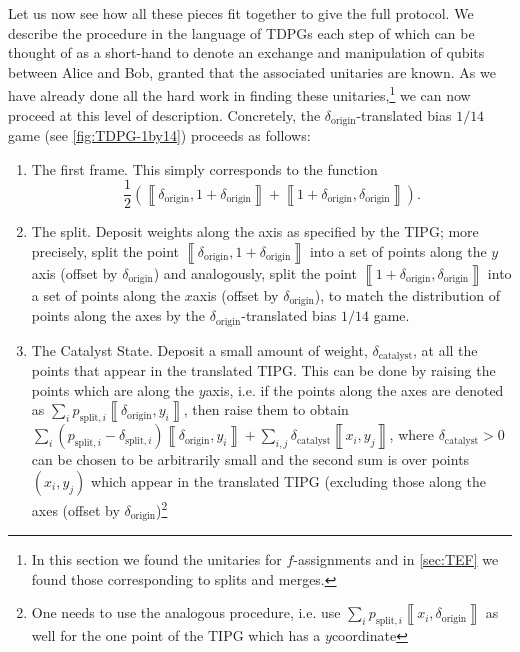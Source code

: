 \documentclass{theoretics}
\newcommand{\atul}[1]{#1} %
\newcommand{\dorigin}[0]{\delta_{\textrm{origin}}} %
\begin{document}
Let us now see how all these pieces fit together
to give the full protocol. We describe the procedure
in the language of TDPGs each step of which can be thought of as a short-hand to denote
an exchange and manipulation of qubits between Alice and Bob, granted that
the associated unitaries are known. As we have already done all the
hard work in finding these unitaries,\footnote{In this section we found the unitaries for $f$-assignments and in \cref{sec:TEF} we found those corresponding to splits and merges.} we can now proceed at this level of description. Concretely, the $\dorigin$-translated bias $1/14$ game (see  \cref{fig:TDPG-1by14}) \atul{proceeds} as follows:
\begin{enumerate}
  \item The first frame. This simply corresponds to the function $$\frac{1}{2}\left(\left\llbracket \dorigin,1 + \dorigin \right\rrbracket +\left\llbracket 1 + \dorigin,\dorigin \right\rrbracket \right).$$
  \item The split. \atul{Deposit weights along the axis as specified by the TIPG; more precisely, split the point $\left\llbracket \dorigin,1 + \dorigin\right\rrbracket $
          into a set of points along the $y$\textendash axis (offset by $\dorigin$) and analogously,
          split the point $\left\llbracket 1 + \dorigin ,\dorigin\right\rrbracket $ into a set of points
          along the $x$\textendash axis (offset by $\dorigin$), to match the distribution of points
          along the axes by the $\dorigin$-translated bias $1/14$ game.}
  \item The Catalyst State. \atul{Deposit a small amount of weight, $\delta_{\text{catalyst}}$,
        at all the points that appear in the translated TIPG. This can be done
        by raising  the points which are
        along the $y$\textendash axis, i.e. if the points along the axes
        are denoted as $\sum_{i}p_{\text{split},i}\left\llbracket \dorigin,y_{i}\right\rrbracket $,
        then raise them to obtain $\sum_{i}(p_{\text{split},i}-\delta_{\text{split},i})\left\llbracket \dorigin,y_{i}\right\rrbracket +\sum_{i,j}\delta_{\text{catalyst}}\left\llbracket x_{i},y_{j}\right\rrbracket $,
        where $\delta_{\text{catalyst}}>0$ can be chosen to be arbitrarily
        small and
        the second sum is over points $(x_{i},y_{j})$ which appear in the
        translated TIPG (excluding those along the axes (offset by $\dorigin$)\footnote{One needs to use the analogous procedure, i.e. use $\sum_{i}p_{\text{split},i}\left\llbracket x_{i},\dorigin\right\rrbracket $
        as well for the one point of the TIPG which has a $y$\textendash coordinate
}}
\end{enumerate}
\end{document}
